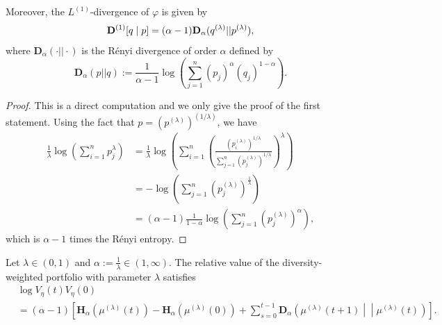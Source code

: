 \documentclass[graybox]{svmult}
\begin{document}
\begin{example}
\begin{proposition}
Moreover, the $L^{(1)}$-divergence of $\varphi$ is given by
\begin{equation}
{\bf D}^{(1)}[q \mid p] = (\alpha - 1) {\bf D}_{\alpha} ( q^{(\lambda)} || p^{(\lambda)} ),
\end{equation}
where $\mathbf{D}_{\alpha}( \cdot || \cdot)$ is the R\'{e}nyi divergence of order $\alpha$ defined by
\begin{equation}
\mathbf{D}_{\alpha}(p || q) := \frac{1}{\alpha - 1} \log \left( \sum_{j = 1}^n (p_j)^{\alpha} (q_j)^{1 - \alpha}\right).
\end{equation}
\end{proposition}
\begin{proof}
This is a direct computation and we only give the proof of the first statement. Using the fact that $p = \left(p^{(\lambda)}\right)^{(1/\lambda)}$, we have
\begin{equation*}
\begin{split}
\frac{1}{\lambda} \log \left( \sum_{i = 1}^n p_j^{\lambda}\right) &= \frac{1}{\lambda} \log \left( \sum_{i = 1}^n   \left(\frac{\left( p_i^{(\lambda)} \right)^{1/\lambda} }{ \sum_{j = 1}^n \left( p_j^{(\lambda)} \right)^{1/\lambda}}\right)^{\lambda}\right) \\
  &= - \log \left( \sum_{j = 1}^n \left( p_j^{(\lambda)} \right)^{\frac{1}{\lambda}} \right) \\
  &= (\alpha - 1) \frac{1}{1 - \alpha} \log \left( \sum_{j = 1}^n \left( p_j^{(\lambda)} \right)^{\alpha} \right),
\end{split}
\end{equation*}
which is $\alpha - 1$ times the R\'{e}nyi entropy.
\end{proof}



\begin{corollary}  \label{cor:diversity.weighted}
Let $\lambda \in (0, 1)$ and $\alpha := \frac{1}{\lambda} \in (1, \infty)$. The relative value of the diversity-weighted portfolio with parameter $\lambda$ satisfies
\begin{equation*}
\begin{split}
& \log {V_{\eta}(t)}{V_{\eta}(0)}\\
&= (\alpha - 1) \left[ \mathbf{H}_{\alpha} \left( \mu^{(\lambda)}(t) \right) - \mathbf{H}_{\alpha} \left( \mu^{(\lambda)}(0) \right) + \sum_{s = 0}^{t - 1} \mathbf{D}_{\alpha} \left(\mu^{(\lambda)}(t + 1) \middle|\middle| \mu^{(\lambda)}(t)\right)\right].
\end{split}
\end{equation*}
\end{corollary}
\end{example}
\end{document}
